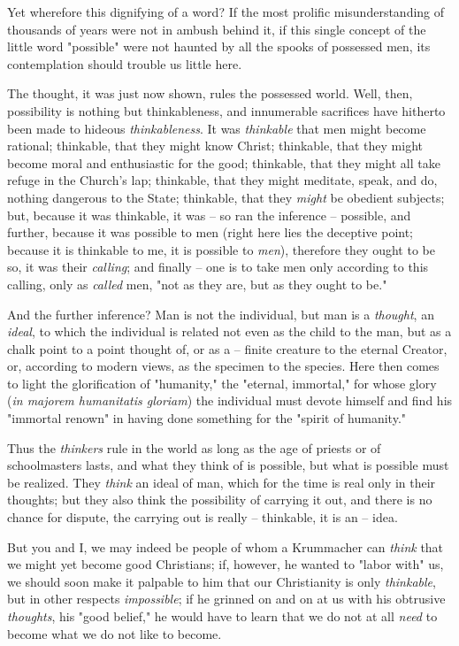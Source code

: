 Yet wherefore this dignifying of a word? If the most prolific misunderstanding 
of thousands of years were not in ambush behind it, if this single concept of 
the little word "{}possible"{} were not haunted by all the spooks of possessed 
men, its contemplation should trouble us little here.

The thought, it was just now shown, rules the possessed world. Well, then, 
possibility is nothing but thinkableness, and innumerable sacrifices have 
hitherto been made to hideous \textit{thinkableness}. It was 
\textit{thinkable} that men might become rational; thinkable, that they might 
know Christ; thinkable, that they might become moral and enthusiastic for the 
good; thinkable, that they might all take refuge in the Church's lap; 
thinkable, that they might meditate, speak, and do, nothing dangerous to the 
State; thinkable, that they \textit{might} be obedient subjects; but, because 
it was thinkable, it was -- so ran the inference -- possible, and further, 
because it was possible to men (right here lies the deceptive point; because 
it is thinkable to me, it is possible to \textit{men}), therefore they ought 
to be so, it was their \textit{calling}; and finally -- one is to take men 
only according to this calling, only as \textit{called} men, "{}not as they 
are, but as they ought to be."{}

And the further inference? Man is not the individual, but man is a 
\textit{thought}, an \textit{ideal}, to which the individual is related not 
even as the child to the man, but as a chalk point to a point thought of, or 
as a -- finite creature to the eternal Creator, or, according to modern views, 
as the specimen to the species. Here then comes to light the glorification of 
"{}humanity,"{} the "{}eternal, immortal,"{} for whose glory (\textit{in 
majorem humanitatis gloriam}) the individual must devote himself and find his 
"{}immortal renown"{} in having done something for the "{}spirit of 
humanity."{}

Thus the \textit{thinkers} rule in the world as long as the age of priests or 
of schoolmasters lasts, and what they think of is possible, but what is 
possible must be realized. They \textit{think} an ideal of man, which for the 
time is real only in their thoughts; but they also think the possibility of 
carrying it out, and there is no chance for dispute, the carrying out is 
really -- thinkable, it is an -- idea.

But you and I, we may indeed be people of whom a Krummacher can \textit{think} 
that we might yet become good Christians; if, however, he wanted to "{}labor 
with"{} us, we should soon make it palpable to him that our Christianity is 
only \textit{thinkable}, but in other respects \textit{impossible}; if he 
grinned on and on at us with his obtrusive \textit{thoughts}, his "{}good 
belief,"{} he would have to learn that we do not at all \textit{need} to 
become what we do not like to become.

